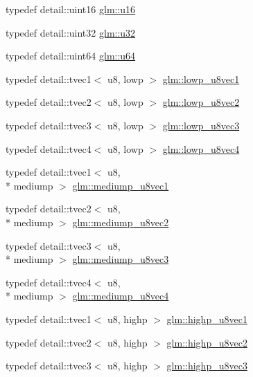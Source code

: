 \begin{DoxyCompactItemize}
\item 
typedef detail\-::uint16 \hyperlink{group__gtc__type__precision_gae7a1571503f83d2264ddfa705a6b082a}{glm\-::u16}
\item 
typedef detail\-::uint32 \hyperlink{group__gtc__type__precision_ga54e837745059fd29017bed71cfa0a8db}{glm\-::u32}
\item 
typedef detail\-::uint64 \hyperlink{group__gtc__type__precision_ga71cedd4972f9cb1a5e14dfe5ab83ecd7}{glm\-::u64}
\item 
typedef detail\-::tvec1$<$ u8, lowp $>$ \hyperlink{group__gtc__type__precision_gaee3cba2c93fa8cb7295671908995197c}{glm\-::lowp\-\_\-u8vec1}
\item 
typedef detail\-::tvec2$<$ u8, lowp $>$ \hyperlink{group__gtc__type__precision_ga8e5a056cbbcb70dca5c65950fa13a787}{glm\-::lowp\-\_\-u8vec2}
\item 
typedef detail\-::tvec3$<$ u8, lowp $>$ \hyperlink{group__gtc__type__precision_gaf0d7154052c636edf4a902fc8a4a56f2}{glm\-::lowp\-\_\-u8vec3}
\item 
typedef detail\-::tvec4$<$ u8, lowp $>$ \hyperlink{group__gtc__type__precision_ga98f82380862128fac9afae1b53840562}{glm\-::lowp\-\_\-u8vec4}
\item 
typedef detail\-::tvec1$<$ u8, \\*
mediump $>$ \hyperlink{group__gtc__type__precision_gadefca284b7a5980fb6be735abb77395e}{glm\-::mediump\-\_\-u8vec1}
\item 
typedef detail\-::tvec2$<$ u8, \\*
mediump $>$ \hyperlink{group__gtc__type__precision_ga5e20c1315bc1fecc867bc74525bea2ab}{glm\-::mediump\-\_\-u8vec2}
\item 
typedef detail\-::tvec3$<$ u8, \\*
mediump $>$ \hyperlink{group__gtc__type__precision_ga58f79eee840b2838443292c50ddb2919}{glm\-::mediump\-\_\-u8vec3}
\item 
typedef detail\-::tvec4$<$ u8, \\*
mediump $>$ \hyperlink{group__gtc__type__precision_ga407b5aa9a3fd6d344b70fa6ce2ce92d4}{glm\-::mediump\-\_\-u8vec4}
\item 
typedef detail\-::tvec1$<$ u8, highp $>$ \hyperlink{group__gtc__type__precision_ga8e7e9156357a2b748fe39702c3bdbeec}{glm\-::highp\-\_\-u8vec1}
\item 
typedef detail\-::tvec2$<$ u8, highp $>$ \hyperlink{group__gtc__type__precision_ga9aed4b3bacd37a43ec369bcf76be144a}{glm\-::highp\-\_\-u8vec2}
\item 
typedef detail\-::tvec3$<$ u8, highp $>$ \hyperlink{group__gtc__type__precision_ga52bdf53a4f05023c13a9b817526d249f}{glm\-::highp\-\_\-u8vec3}

\end{DoxyCompactItemize}
